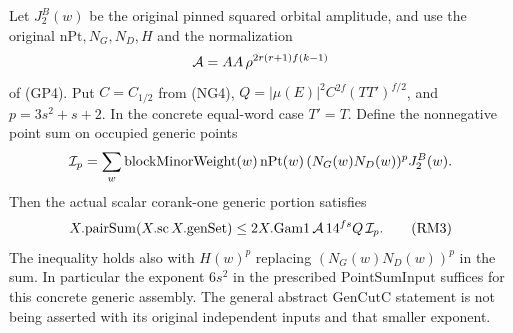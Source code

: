 \begin{theorem}
\label{thm:flag-reduced-moment}
Let \(J_2^B(w)\) be the original pinned squared orbital
amplitude, and use the original \(\mathrm{nPt},N_G,N_D,H\)
and the normalization
\[
 {\cal A}=AA\,\rho^{2r(r+1)f(k-1)}
\]
of (GP4). Put \(C=C_{1/2}\) from (NG4),
\(Q=|\mu(E)|^2 C^{2f}(TT')^{f/2}\), and
\(p=3s^2+s+2\). In the concrete equal-word case \(T'=T\).
Define the nonnegative point sum on occupied generic points
\[
 {\cal I}_p=\sum_w
 \mathrm{blockMinorWeight}(w)\,\mathrm{nPt}(w)\,
                      (N_G(w)N_D(w))^p J_2^B(w).
\]
Then the actual scalar corank-one generic portion satisfies
\[
 X.\mathrm{pairSum}(X.\mathrm{sc}\,X.\mathrm{genSet})
       \le 2 X.\mathrm{Gam1}\,{\cal A}\,
                         14^{fs}Q\,{\cal I}_p.           \tag{RM3}
\]
The inequality holds also with \(H(w)^p\) replacing
\((N_G(w)N_D(w))^p\) in the sum.
In particular the exponent \(6s^2\) in the prescribed
\(\mathrm{PointSumInput}\) suffices for this concrete
generic assembly. The general abstract
\(\mathrm{GenCutC}\) statement is not being asserted with
its original independent inputs and that smaller exponent.
\end{theorem}
